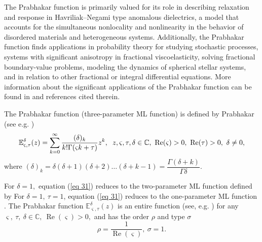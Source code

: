 \documentclass[a4paper,12pt]{article}
\theoremstyle{remark}
\begin{document}
\noindent The Prabhakar function is primarily valued for its role in describing relaxation and response in Havriliak–Negami type anomalous dielectrics, a model that accounts for the simultaneous nonlocality and nonlinearity in the behavior of disordered materials and heterogeneous systems. Additionally, the Prabhakar function finds applications in probability theory for studying stochastic processes, systems with significant anisotropy in fractional viscoelasticity, solving fractional boundary-value problems, modeling the dynamics of spherical stellar systems, and in relation to other fractional or integral differential equations. More information about the significant applications of the Prabhakar function can be found in \cite{roberto2018} and references cited therein.


\noindent The  Prabhakar function %
(three-parameter ML function)
is defined by Prabhakar \cite{prabhakar1971} (see e.g. \cite{gorenflo2014})
\begin{equation}\label{eq 31}
\mathbb{E}_{ \varsigma,\tau}^\delta(z)=\sum_{k=0}^{\infty}\frac{(\delta)_k}{k! \Gamma( \varsigma k+\tau )}z^k,  \hspace{2mm}z, \varsigma,\tau,\delta\in \mathbb{C},~ \operatorname{Re}( \varsigma)>0 , ~ \operatorname{Re}(\tau)>0,~ \delta\ne 0, 
\end{equation}
where $(\delta)_k= \delta (\delta+1)(\delta+2)\dots (\delta +k-1)=\dfrac{\Gamma (\delta +k)}{\Gamma \delta}.$

\noindent For $\delta=1,$ equation (\ref{eq 31}) reduces to the two-parameter  ML function  defined by \cite{wiman1905}
For $\delta=1, ~ \tau =1$, equation (\ref{eq 31}) reduces to the one-parameter  ML function \cite{mittag1905}. %
The Prabhakar function $\mathbb{E}^\delta_{ \varsigma,\tau}(z)$ is an entire function (see, e.g. \cite[p.10]{G}) for any $ \varsigma,~\tau,~\delta\in\mathbb{C},~\operatorname{Re}( \varsigma)>0,$
and has the order $\rho$ and type $\sigma$
\begin{equation}
\rho=\frac{1}{\operatorname{Re}( \varsigma)},~\sigma=1.
\end{equation}
\end{document}
